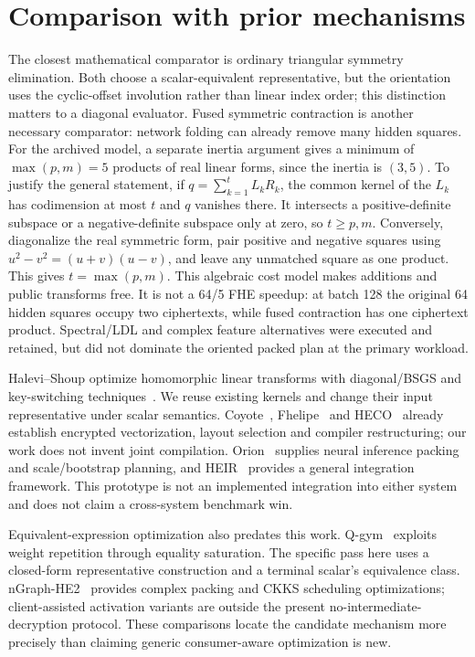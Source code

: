 \documentclass[10pt]{article}
\begin{document}
\section{Comparison with prior mechanisms}\label{sec:related}
The closest mathematical comparator is ordinary triangular symmetry elimination. Both choose a scalar-equivalent representative, but the orientation uses the cyclic-offset involution rather than linear index order; this distinction matters to a diagonal evaluator. Fused symmetric contraction is another necessary comparator: network folding can already remove many hidden squares. For the archived model, a separate inertia argument gives a minimum of $\max(p,m)=5$ products of real linear forms, since the inertia is $(3,5)$. To justify the general statement, if $q=\sum_{k=1}^t L_kR_k$, the common kernel of the $L_k$ has codimension at most $t$ and $q$ vanishes there. It intersects a positive-definite subspace or a negative-definite subspace only at zero, so $t\ge p,m$. Conversely, diagonalize the real symmetric form, pair positive and negative squares using $u^2-v^2=(u+v)(u-v)$, and leave any unmatched square as one product. This gives $t=\max(p,m)$. This algebraic cost model makes additions and public transforms free. It is not a 64/5 FHE speedup: at batch 128 the original 64 hidden squares occupy two ciphertexts, while fused contraction has one ciphertext product. Spectral/LDL and complex feature alternatives were executed and retained, but did not dominate the oriented packed plan at the primary workload.

Halevi--Shoup optimize homomorphic linear transforms with diagonal/BSGS and key-switching techniques~\citep{halevishoup}. We reuse existing kernels and change their input representative under scalar semantics. Coyote~\citep{coyote}, Fhelipe~\citep{fhelipe} and HECO~\citep{heco} already establish encrypted vectorization, layout selection and compiler restructuring; our work does not invent joint compilation. Orion~\citep{orion} supplies neural inference packing and scale/bootstrap planning, and HEIR~\citep{heir} provides a general integration framework. This prototype is not an implemented integration into either system and does not claim a cross-system benchmark win.

Equivalent-expression optimization also predates this work. Q-gym~\citep{qgym} exploits weight repetition through equality saturation. The specific pass here uses a closed-form representative construction and a terminal scalar's equivalence class. nGraph-HE2~\citep{ngraphhe2} provides complex packing and CKKS scheduling optimizations; client-assisted activation variants are outside the present no-intermediate-decryption protocol. These comparisons locate the candidate mechanism more precisely than claiming generic consumer-aware optimization is new.
\end{document}

